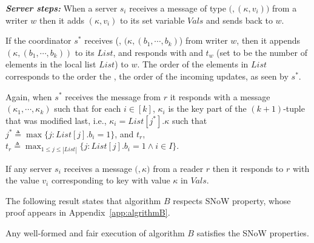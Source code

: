 \textit{\textbf{Server steps:}}  
When a server $s_i$ receives a message of type $(${\writeValueTag}$, ({\kappa}, v_{i}))$ from a writer $w$ then 
it  adds $({\kappa}, v_i)$ to its set variable  
$Vals$ and sends {\ackTag} back to $w$.

If the coordinator $s^*$ receives  (\updateCoordTag, $({\kappa}, (b_{1}, \cdots, b_{k})$) from writer $w$, then it appends  
			 $({\kappa}, (b_{1}, \cdots, b_{k}))$ to its  $List$,  and responds with  
			 {\ackTag} and $t_{w}$ (set to be the number of elements in the local list $List$)  to $w$.
			 The order of the  elements in  $List$ corresponds to  the order  
the \wots{}, the order of the incoming  {\updateCoordTag} updates,  as seen by $s^*$.
	
Again, when $s^*$  receives  the message  {\getTagArrayTag} from $r$  it responds with a message 
$(\kappa_1, \cdots, \kappa_k)$ such that for each $i \in [k]$, $\kappa_i$ is the key  part of the $(k+1)$-tuple that was modified
last, i.e., 	${\kappa}_i = List[j^*].{\kappa}$ such that 	 $j^* \triangleq\max \{ j : List[j].b_i =1 \}$, and 
$t_r$, $t_r \triangleq \max_{1 \leq j \leq |List|} \{ j : List[j].b_i = 1 \wedge i \in I\}$.

  	If any server $s_i$ receives a message  $(${\readValueTag}$, {\kappa})$ from a reader $r$ then it responds to $r$ with 
   the value $v_i$ corresponding to key with value  $\kappa$ in  $Vals$. 

The following result states that algorithm $B$ respects SNoW  property, whose proof appears in Appendix~\ref{app:algrithmB}.

	\begin{theorem} Any well-formed  and fair execution of algorithm $B$  satisfies the SNoW  properties. %
	\end{theorem}


